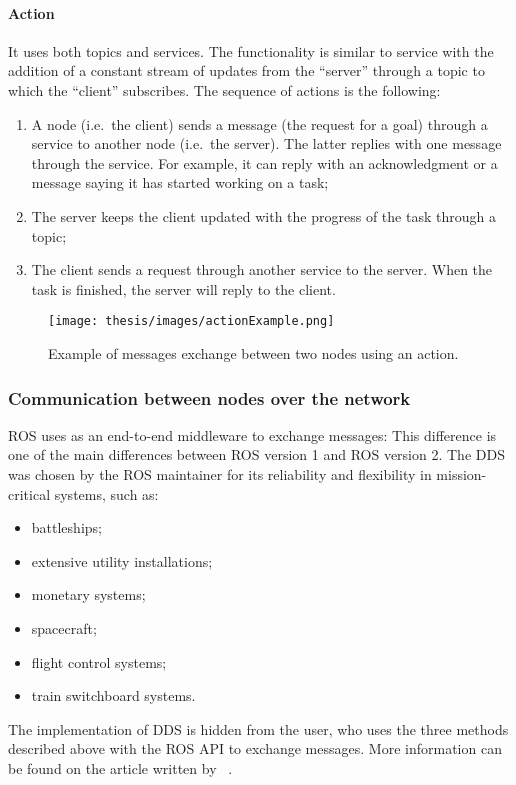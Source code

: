 \documentclass[../thesis.tex]{subfiles}
\begin{document}
\paragraph{Action}
It uses both topics and services. The functionality is similar to service with the addition of a constant stream of updates from the ``server'' through a topic to which the ``client'' subscribes. The sequence of actions is the following: 
    \begin{enumerate}
        \item A node (i.e.\ the client) sends a message (the request for a goal) through a service to another node  (i.e.\ the server). The latter replies with one message through the service. For example, it can reply with an acknowledgment or a message saying it has started working on a task; 
        \item The server keeps the client updated with the progress of the task through a topic; 
        \item The client sends a request through another service to the server. When the task is finished, the server will reply to the client. 
    \end{enumerate}
\begin{figure}[H]
    \centering
    \texttt{[image: thesis/images/actionExample.png]}
    \caption{Example of messages exchange between two nodes using an action.}
    \label{fig:exampleActionExchangeMessage}
\end{figure}

\subsubsection{Communication between nodes over the network}
\gls{ROS} uses  as an end-to-end middleware to exchange messages:  This difference is one of the main differences between \gls{ROS} version 1 and \gls{ROS} version 2. The \gls{DDS} was chosen by the \gls{ROS} maintainer for its reliability and flexibility in mission-critical systems, such as:
\begin{itemize}
    \item battleships;
    \item extensive utility installations;
    \item monetary systems;
    \item spacecraft;
    \item flight control systems;
    \item train switchboard systems.
\end{itemize}
The implementation of \gls{DDS} is hidden from the user, who uses the three methods described above with the \gls{ROS} API to exchange messages. More information can be found on the article written by \citeauthor{site:ros_dds}~\cite{site:ros_dds}.
\end{document}
